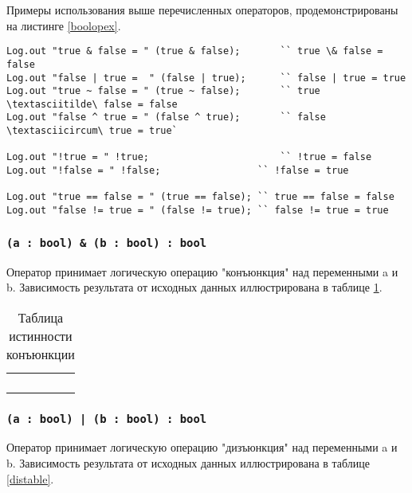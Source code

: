 Примеры использования выше перечисленных операторов, продемонстрированы на листинге \ref{boolopex}.

\begin{lstlisting}[caption=Примеры использования операторов над данными типа bool, label=boolopex]
Log.out "true & false = " (true & false);		`` true \& false = false
Log.out "false | true =  " (false | true);		`` false | true = true
Log.out "true ~ false = " (true ~ false);		`` true \textasciitilde\ false = false
Log.out "false ^ true = " (false ^ true);		`` false \textasciicircum\ true = true`

Log.out "!true = " !true;						`` !true = false
Log.out "!false = " !false;					`` !false = true

Log.out "true == false = " (true == false);	`` true == false = false
Log.out "false != true = " (false != true);	`` false != true = true
\end{lstlisting}

\subsubsection{\lstinline`(a : bool) & (b : bool) : bool`}

Оператор принимает логическую операцию "конъюнкция" над переменными a и b. Зависимость результата от исходных данных иллюстрирована в таблице \ref{conjtable}.

\begin{table}[htb]
	\caption{Таблица истинности конъюнкции}
	\label{conjtable}
	\begin{tabular}{|c|c|c|}
		\hline
		\code{a} & \code{b} & \code{a \& b} \\ \hline
		\false{} & \false{} & \false{}  	\\ \hline
		\false{} & \true{}  & \false{}  	\\ \hline
		\true{}  & \false{} & \false{}  	\\ \hline
		\true{}  & \true{}  & \true{}   	\\ \hline
	\end{tabular}
	\vspace{-2em}
\end{table}

\subsubsection{\lstinline`(a : bool) | (b : bool) : bool`}

Оператор принимает логическую операцию "дизъюнкция" над переменными a и b. Зависимость результата от исходных данных иллюстрирована в таблице \ref{distable}.

